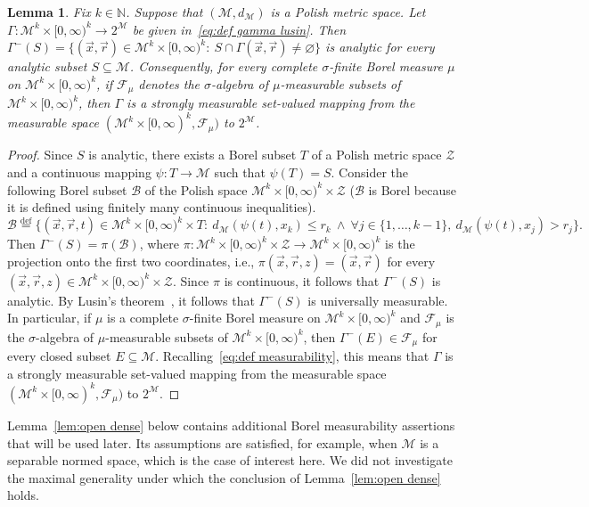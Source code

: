 \documentclass[11pt,reqno]{amsart}
\renewcommand{\le}{\leqslant}
\newtheorem{lemma}[theorem]{Lemma}
\theoremstyle{remark}
\newcommand{\MM}{\mathcal{M}}
\renewcommand{\subset}{\subseteq}
\newcommand{\N}{\mathbb N}
\newcommand{\eqdef}{\stackrel{\mathrm{def}}{=}}
\renewcommand{\emptyset}{\varnothing}
\renewcommand{\1}{\mathbf 1}
\newcommand{\ZZ}{\mathcal{Z}}
\newcommand{\cF}{\mathscr{F}}
\begin{document}
\begin{lemma}\label{lem:analytic} Fix $k\in \N$.  Suppose that $(\MM,d_{\MM})$ is a Polish metric space. Let $\Gamma:{\MM}^k\times [0,\infty)^k\to 2^{\MM}$ be given in~\eqref{eq:def gamma lusin}. Then $\Gamma^-(S)=\{(\vec{x},\vec{r})\in {\MM}^k\times [0,\infty)^k:\ S\cap \Gamma(\vec{x},\vec{r})\neq \emptyset \}$ is analytic for every analytic subset $S\subset \MM$. Consequently, for every complete $\sigma$-finite Borel measure $\mu$ on  ${\MM}^k\times [0,\infty)^k$, if $\mathscr{F}_\mu$ denotes the  $\sigma$-algebra of $\mu$-measurable subsets of ${\MM}^k\times [0,\infty)^k$, then $\Gamma$ is a strongly measurable set-valued mapping from the measurable space $({\MM}^k\times [0,\infty)^k,\mathscr{F}_\mu)$ to $2^\MM$.
\end{lemma}

\begin{proof} Since $S$ is analytic, there exists a Borel subset $T$ of a  Polish metric space $\ZZ$ and a continuous mapping $\psi:T\to \MM$ such that $\psi(T)=S$.  Consider the following Borel subset $\mathcal{B}$ of the Polish  space ${\MM}^k\times [0,\infty)^k\times \ZZ$ ($\mathcal{B}$ is Borel because it is defined using finitely many continuous inequalities).
$$
\mathcal{B}\eqdef\Big\{(\vec{x},\vec{r},t)\in {\MM}^k\times [0,\infty)^k\times T:\ d_{\MM}(\psi(t),x_k)\le r_k\ \wedge\ \forall  j\in \{1,\ldots,k-1\},\ d_{\MM}(\psi(t),x_j)>r_j\Big\}.
$$
Then $\Gamma^-(S)=\pi(\mathcal{B})$, where $\pi:{\MM}^k\times [0,\infty)^k\times \ZZ\to {\MM}^k\times [0,\infty)^k$ is the projection onto the first two coordinates, i.e., $\pi(\vec{x},\vec{r},z)=(\vec{x},\vec{r})$ for every $(\vec{x},\vec{r},z)\in {\MM}^k\times [0,\infty)^k\times \ZZ$. Since  $\pi$ is continuous, it follows that $\Gamma^-(S)$ is analytic. By Lusin's theorem~\cite{Luz17,Lus72}, it follows that $\Gamma^-(S)$ is  universally measurable. In particular, if $\mu$ is a complete $\sigma$-finite Borel measure  on ${\MM}^k\times [0,\infty)^k$ and $\cF_\mu$ is the $\sigma$-algebra of $\mu$-measurable subsets of ${\MM}^k\times [0,\infty)^k$, then  $\Gamma^-(E)\in \cF_\mu$ for every closed subset $E\subset \MM$. Recalling~\eqref{eq:def measurability}, this means that $\Gamma$ is a strongly measurable set-valued mapping from the measurable space $({\MM}^k\times [0,\infty)^k,\cF_\mu)$ to $2^\MM$.
\end{proof}






Lemma~\ref{lem:open dense} below contains additional Borel measurability assertions that will be used later. Its assumptions are satisfied, for example, when $\MM$ is a separable normed space, which is the case of interest here. We did not investigate the maximal generality under which the conclusion of Lemma~\ref{lem:open dense} holds.
\end{document}
